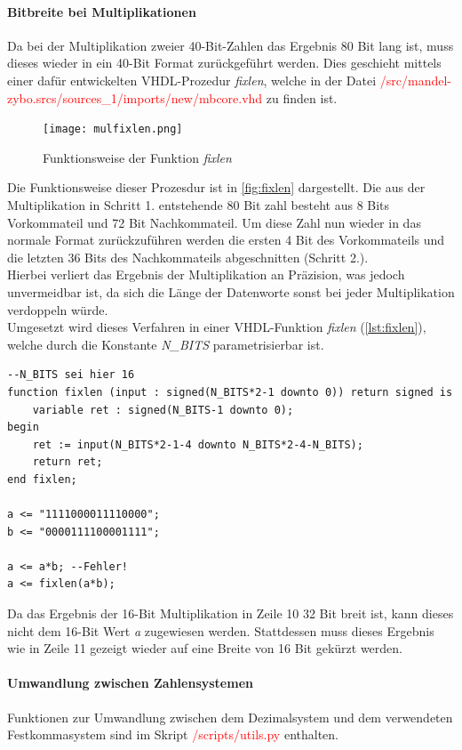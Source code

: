 \documentclass[a4paper,12pt,onesided]{report}
\begin{document}
\paragraph{Bitbreite bei Multiplikationen}
Da bei der Multiplikation zweier 40-Bit-Zahlen das Ergebnis 80 Bit lang ist, muss dieses wieder in ein 40-Bit Format zurückgeführt werden.
Dies geschieht mittels einer dafür entwickelten VHDL-Prozedur \textit{fixlen}, welche in der Datei \textcolor{red}{/src/mandel-zybo.srcs/sources\_1/imports/new/mbcore.vhd} zu finden ist.

\begin{figure}[H]
	\centering
	\texttt{[image: mulfixlen.png]}
	\caption{Funktionsweise der Funktion \textit{fixlen}}
	\label{fig:fixlen}
\end{figure}

Die Funktionsweise dieser Prozesdur ist in \autoref{fig:fixlen} dargestellt.
Die aus der Multiplikation in Schritt 1. entstehende 80 Bit zahl besteht aus 8 Bits Vorkommateil und 72 Bit Nachkommateil.
Um diese Zahl nun wieder in das normale Format zurückzuführen werden die ersten 4 Bit des Vorkommateils und die letzten 36 Bits des Nachkommateils abgeschnitten (Schritt 2.).\\
Hierbei verliert das Ergebnis der Multiplikation an Präzision, was jedoch unvermeidbar ist, da sich die Länge der Datenworte sonst bei jeder Multiplikation verdoppeln würde.\\
Umgesetzt wird dieses Verfahren in einer VHDL-Funktion \textit{fixlen} (\autoref{lst:fixlen}), welche durch die Konstante \textit{N\_BITS} parametrisierbar ist.
\begin{lstlisting}[label=lst:fixlen,caption=VHDL-Funktion \textit{fixlen} aus \textcolor{red}{/src/mandel-zybo.srcs/sources\_1/imports/new/mbcore.vhd}]
--N_BITS sei hier 16
function fixlen (input : signed(N_BITS*2-1 downto 0)) return signed is
	variable ret : signed(N_BITS-1 downto 0);
begin
	ret := input(N_BITS*2-1-4 downto N_BITS*2-4-N_BITS);
	return ret;
end fixlen;

a <= "1111000011110000";
b <= "0000111100001111";

a <= a*b; --Fehler!
a <= fixlen(a*b);
\end{lstlisting}
Da das Ergebnis der 16-Bit Multiplikation in Zeile 10 32 Bit breit ist, kann dieses nicht dem 16-Bit Wert \textit{a} zugewiesen werden.
Stattdessen muss dieses Ergebnis wie in Zeile 11 gezeigt wieder auf eine Breite von 16 Bit gekürzt werden.

\paragraph{Umwandlung zwischen Zahlensystemen}
Funktionen zur Umwandlung zwischen dem Dezimalsystem und dem verwendeten Festkommasystem sind im Skript \textcolor{red}{/scripts/utils.py} enthalten.
\end{document}
